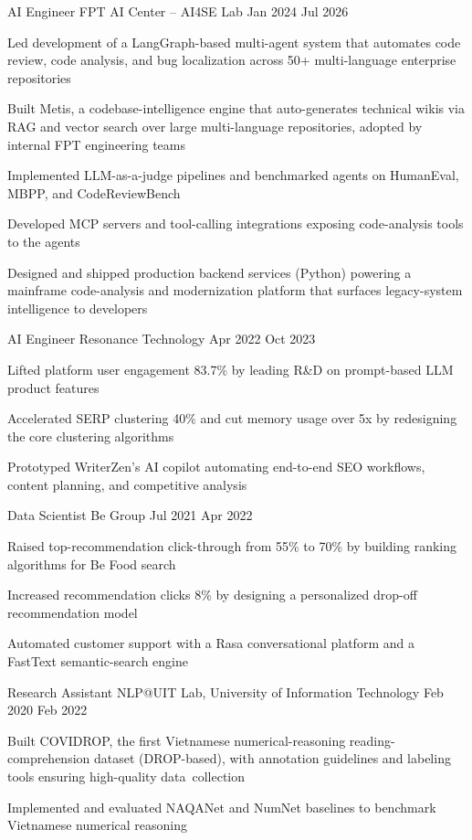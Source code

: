 
\experience
    {AI Engineer}
    {FPT AI Center -- AI4SE Lab}
    {Jan 2024}
    {Jul 2026}
    {
        \item Led development of a LangGraph-based multi-agent system that automates code review, code analysis, and bug localization across 50+ multi-language enterprise repositories
        \item Built Metis, a codebase-intelligence engine that auto-generates technical wikis via RAG and vector search over large multi-language repositories, adopted by internal FPT engineering teams
        \item Implemented LLM-as-a-judge pipelines and benchmarked agents on HumanEval, MBPP, and CodeReviewBench
        \item Developed MCP servers and tool-calling integrations exposing code-analysis tools to the agents
        \item Designed and shipped production backend services (Python) powering a mainframe code-analysis and modernization platform that surfaces legacy-system intelligence to developers
    }

\experience
    {AI Engineer}
    {Resonance Technology}
    {Apr 2022}
    {Oct 2023}
    {
        \item Lifted platform user engagement 83.7\% by leading R\&D on prompt-based LLM product features
        \item Accelerated SERP clustering 40\% and cut memory usage over 5x by redesigning the core clustering algorithms
        \item Prototyped WriterZen's AI copilot automating end-to-end SEO workflows, content planning, and competitive analysis
    }

\experience
    {Data Scientist}
    {Be Group}
    {Jul 2021}
    {Apr 2022}
    {
        \item Raised top-recommendation click-through from 55\% to 70\% by building ranking algorithms for Be Food search
        \item Increased recommendation clicks 8\% by designing a personalized drop-off recommendation model
        \item Automated customer support with a Rasa conversational platform and a FastText semantic-search engine
    }

\experience
    {Research Assistant}
    {NLP@UIT Lab, University of Information Technology}
    {Feb 2020}
    {Feb 2022}
    {
        \item Built COVIDROP, the first Vietnamese numerical-reasoning reading-comprehension dataset (DROP-based), with annotation guidelines and labeling tools ensuring high-quality data~collection
        \item Implemented and evaluated NAQANet and NumNet baselines to benchmark Vietnamese numerical reasoning
    }
